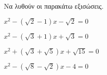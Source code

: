 Να λυθούν οι παρακάτω εξισώσεις.
\begin{alist}[itemsep=0mm]
\item $ x^2-\left(\sqrt{2}-1\right)x-\sqrt{2}=0 $
\item $ x^2-\left(\sqrt{3}+1\right)x+\sqrt{3}=0 $
\item $ x^2+\left(\sqrt{3}+\sqrt{5}\right)x+\sqrt{15}=0 $
\item $ x^2-\left(\sqrt{8}-\sqrt{2}\right)x-4=0 $
\end{alist}

